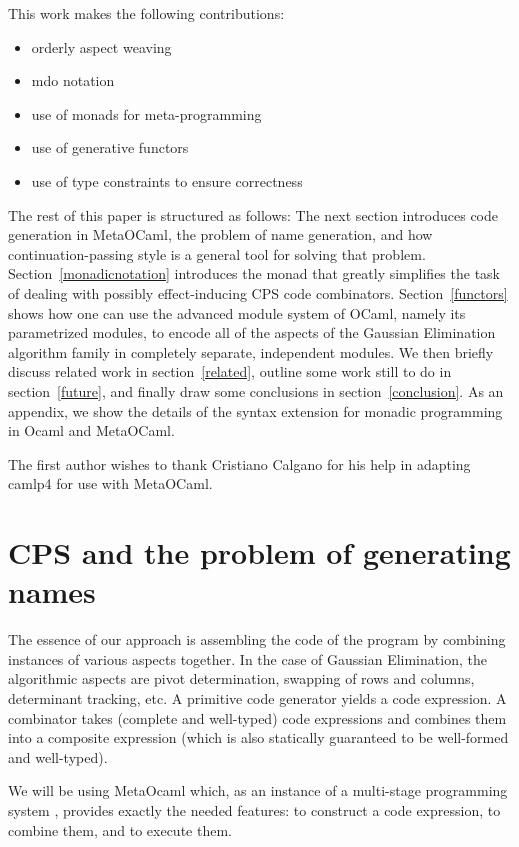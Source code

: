 \documentclass{llncs}
\begin{document}
This work makes the following contributions:
\begin{itemize}
    \item orderly aspect weaving
    \item mdo notation
    \item use of monads for meta-programming
    \item use of generative functors
    \item use of type constraints to ensure correctness
\end{itemize}

The rest of this paper is structured as follows:
The next section introduces code generation in MetaOCaml, the problem
of name generation, and how continuation-passing style is a general
tool for solving that problem.  Section~\ref{monadicnotation} introduces
the monad that greatly simplifies the task of dealing with
possibly effect-inducing CPS code combinators.  Section~\ref{functors}
shows how one can use the advanced module system of OCaml, namely its
parametrized modules, to encode all of the aspects of the Gaussian
Elimination algorithm family in completely separate, independent modules.
We then briefly discuss related work in section~\ref{related}, outline
some work still to do in section~\ref{future}, and finally draw some 
conclusions in section~\ref{conclusion}.  As an appendix, we show
the details of the syntax extension for monadic programming in Ocaml
and MetaOCaml.

The first author wishes to thank Cristiano Calgano for his help in
adapting camlp4 for use with MetaOCaml.

\section{CPS and the problem of generating names}\label{CPS}

The essence of our approach is assembling the code of the program by
combining instances of various aspects together. In the case of
Gaussian Elimination, the algorithmic aspects are pivot determination, 
swapping of
rows and columns, determinant tracking, etc. A primitive code
generator yields a code expression.  A combinator takes (complete and
well-typed) code expressions and combines them into a composite expression
(which is also statically guaranteed to be well-formed and well-typed).

We will be using MetaOcaml which, as an instance of a multi-stage
programming system \cite{TahaThesis}, provides exactly the needed
features: to construct a code expression, to combine them, and to
execute them.
\end{document}
